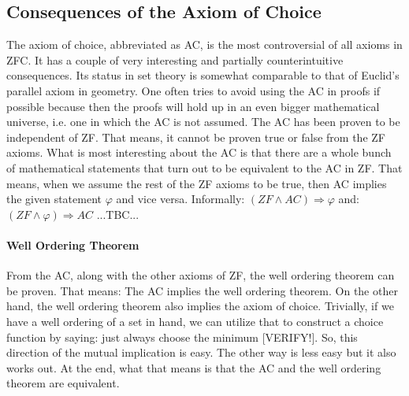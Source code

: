






\subsection{Consequences of the Axiom of Choice}
The axiom of choice, abbreviated as AC, is the most controversial of all axioms in ZFC. It has a couple of very interesting and partially counterintuitive consequences. Its status in set theory is somewhat comparable to that of Euclid's parallel axiom in geometry. One often tries to avoid using the AC in proofs if possible because then the proofs will hold up in an even bigger mathematical universe, i.e. one in which the AC is not assumed. The AC has been proven to be independent of ZF. That means, it cannot be proven true or false from the ZF axioms. What is most interesting about the AC is that there are a whole bunch of mathematical statements that turn out to be equivalent to the AC in ZF. That means, when we assume the rest of the ZF axioms to be true, then AC implies the given statement $\varphi$ and vice versa. Informally: $(ZF \wedge AC) \Rightarrow \varphi$ and: $(ZF \wedge \varphi) \Rightarrow AC$   ...TBC...



\paragraph{Well Ordering Theorem} 
From the AC, along with the other axioms of ZF, the well ordering theorem can be proven. That means: The AC implies the well ordering theorem. On the other hand, the well ordering theorem also implies the axiom of choice. Trivially, if we have a well ordering of a set in hand, we can utilize that to construct a choice function by saying: just always choose the minimum [VERIFY!]. So, this direction of the mutual implication is easy. The other way is less easy but it also works out. At the end, what that means is that the AC and the well ordering theorem are equivalent.

